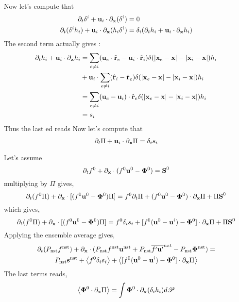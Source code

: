 Now let's compute that 
\begin{align*}
    \partial_t \delta^i +\textbf{u}_i  \cdot {\partial_\textbf{x}}  ( \delta^i) &= 0 \\
    \partial_t (\delta^i h_i) +\textbf{u}_i  \cdot {\partial_\textbf{x}}  (h_i  \delta^i) &
    = \delta_i (\partial_t h_i  + \textbf{u}_i \cdot {\partial_\textbf{x}} h_i)\\
\end{align*}
The second term actually gives :
\begin{align*}
    \partial_t h_i  + \textbf{u}_i \cdot {\partial_\textbf{x}} h_i
    &= 
    \sum_{e \neq i} (\textbf{u}_e \cdot \hat{\textbf{r}}_e - \textbf{u}_i \cdot \hat{\textbf{r}}_i)
    \delta(|\textbf{x}_e - \textbf{x}| - |\textbf{x}_i - \textbf{x}|) h_i\\
    &+ \textbf{u}_i \cdot 
    \sum_{e \neq i} (\hat{\textbf{r}}_i - \hat{\textbf{r}}_e)
    \delta(|\textbf{x}_e - \textbf{x}| - |\textbf{x}_i - \textbf{x}|) h_i \\
    &= 
    \sum_{e \neq i} (\textbf{u}_e -\textbf{u}_i)\cdot \hat{\textbf{r}}_e 
    \delta(|\textbf{x}_e - \textbf{x}| - |\textbf{x}_i - \textbf{x}|) h_i\\
    &= s_i\\
\end{align*}
Thus the last ed reads 
Now let's compute that 
\begin{align*}
    \partial_t \Pi +\textbf{u}_i  \cdot {\partial_\textbf{x}} \Pi &
    = \delta_i s_i\\
\end{align*}

Let's assume 
\begin{equation}
    \partial_t f^0
    + {\partial_\textbf{x}} \cdot (
        f^0\textbf{u}^0
        - \mathbf{\Phi}^0
    )
    = 
    \textbf{S}^0
    \label{eq:dt_f}
\end{equation}
multiplying by $\Pi$ gives, 
\begin{equation}
    \partial_t (f^0\Pi)
    + {\partial_\textbf{x}} \cdot [(
        f^0\textbf{u}^0
        - \mathbf{\Phi}^0
    )\Pi]
    = 
    f^0 \partial_t \Pi
    + (
        f^0\textbf{u}^0
        - \mathbf{\Phi}^0
    )\cdot {\partial_\textbf{x}} \Pi
    + \Pi\textbf{S}^0
\end{equation}
which gives, 
\begin{equation}
    \partial_t (f^0\Pi)
    + {\partial_\textbf{x}} \cdot [(
        f^0\textbf{u}^0
        - \mathbf{\Phi}^0
    )\Pi]
    = 
    f^0 \delta_i s_i
    + [f^0 (\textbf{u}^0 - \textbf{u}^i)
    - \mathbf{\Phi}^0]
    \cdot {\partial_\textbf{x}} \Pi
    + \Pi\textbf{S}^0
\end{equation}
Applying the ensemble average gives, 
\begin{multline}
    \partial_t (P_\text{nst}f^\text{nst})
    + {\partial_\textbf{x}} \cdot (
        P_\text{nst}f^\text{nst}\textbf{u}^\text{nst}
        + P_\text{nst}\overline{f'\textbf{u}'}^{nst}
        - P_\text{nst}\mathbf{\Phi}^\text{nst}
    )
    = \\
    P_\text{nst}\textbf{s}^\text{nst}
    + \left<f^0 \delta_i s_i\right>
    + \left<[f^0 (\textbf{u}^0 - \textbf{u}^i)
    - \mathbf{\Phi}^0]
    \cdot {\partial_\textbf{x}} \Pi\right>
\end{multline}
The last terms reads, 
\begin{equation}
    \left<\mathbf{\Phi}^0
    \cdot {\partial_\textbf{x}} \Pi\right>
    = 
    \int 
     \mathbf{\Phi}^0
    \cdot {\partial_\textbf{x}} (\delta_i h_i )d\mathscr{P}
\end{equation}